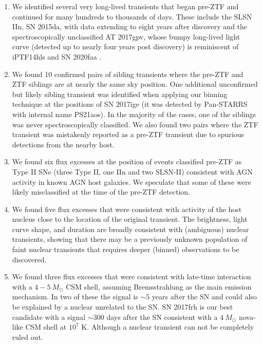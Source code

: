 \documentclass[a4paper,oneside,12pt, class=Latex/Classes/PhDthesisPSnPDF, crop=false]{standalone}
\begin{document}
\begin{enumerate}
    
    \item We identified several very long-lived transients that began pre-ZTF and continued for many hundreds to thousands of days. These include the SLSN IIn, SN 2015da, with data extending to eight years after discovery and the spectroscopically unclassified AT 2017gpv, whose bumpy long-lived light curve (detected up to nearly four years post discovery) is reminiscent of iPTF14hls \citep{iPTF14hls_Iair,Sollerman_2019_iptf14hls} and SN 2020faa \citep{Yang_2021_20faa, 2020faa_hidden_shocks}. 
    \item We found 10 confirmed pairs of sibling transients where the pre-ZTF and ZTF siblings are at nearly the same sky position. One additional unconfirmed but likely sibling transient was identified when applying our binning technique at the positions of SN 2017ige (it was detected by Pan-STARRS with internal name PS21aos). In the majority of the cases, one of the siblings was never spectroscopically classified. We also found two pairs where the ZTF transient was mistakenly reported as a pre-ZTF transient due to spurious detections from the nearby host.
    \item We found six flux excesses at the position of events classified pre-ZTF as Type II SNe (three Type II, one IIn and two SLSN-II) consistent with AGN activity in known AGN host galaxies. We speculate that some of these were likely misclassified at the time of the pre-ZTF detection.
    \item We found five flux excesses that were consistent with activity of the host nucleus close to the location of the original transient. The brightness, light curve shape, and duration are broadly consistent with (ambiguous) nuclear transients, showing that there may be a previously unknown population of faint nuclear transients that requires deeper (binned) observations to be discovered.
    \item We found three flux excesses that were consistent with late-time interaction with a $4 - 5\ M_\odot$ CSM shell, assuming Bremsstrahlung as the main emission mechanism. In two of these the signal is $\sim5$ years after the SN and could also be explained by a nuclear unrelated to the SN. SN 2017frh is our best candidate with a signal $\sim300$ days after the SN consistent with a $4\ M_\odot$ nova-like CSM shell at $10^7$ K. Although a nuclear transient can not be completely ruled out.
 \end{enumerate}
\end{document}
